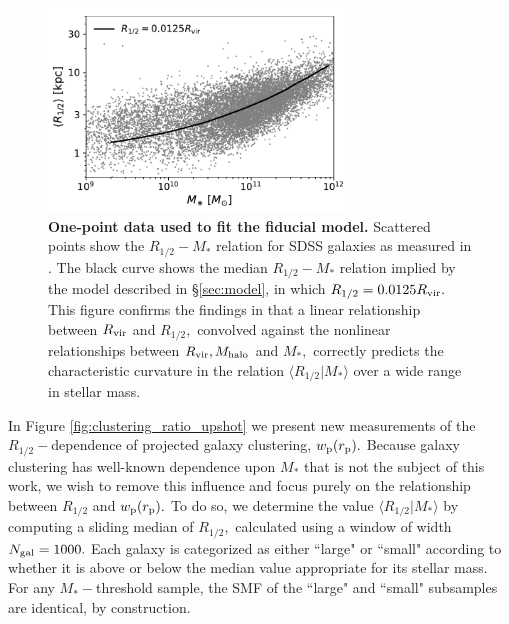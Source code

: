 \documentclass[usenatbib,usegraphicx,letterpaper]{mn2e}
\newcommand{\rhalf}{R_{1/2}}
\newcommand{\mstar}{M_{\ast}}
\newcommand{\mhalo}{M_{\rm halo}}
\newcommand{\rvir}{R_{\rm vir}}
\newcommand{\rproj}{r_{\rm p}}
\newcommand{\wproj}{w_{\rm p}}
\begin{document}
\begin{figure}
\centering
\includegraphics[width=8cm]{FIGS/single_component_model_vs_sdss_one_point.pdf}
\caption{
{\bf One-point data used to fit the fiducial model.}
Scattered points show the $\rhalf-\mstar$ relation for SDSS galaxies as measured in \citet{meert_etal15}. The black curve shows the median $\rhalf-\mstar$ relation implied by the model described in \S\ref{sec:model}, in which $\rhalf=0.0125\rvir.$ This figure confirms the findings in \citet{kravtsov13} that a linear relationship between $\rvir$ and $\rhalf,$ convolved against the nonlinear relationships between $\rvir, \mhalo$ and $\mstar,$ correctly predicts the characteristic curvature in the relation $\langle\rhalf\vert\mstar\rangle$ over a wide range in stellar mass.
}
\label{fig:scatter_plot}
\end{figure}

In Figure \ref{fig:clustering_ratio_upshot} we present new measurements of the $\rhalf-$dependence of projected galaxy clustering, $\wproj(\rproj).$ Because galaxy clustering has well-known dependence upon $\mstar$ that is not the subject of this work, we wish to remove this influence and focus purely on the relationship between $\rhalf$ and $\wproj(\rproj).$ To do so, we determine the value $\langle\rhalf\vert\mstar\rangle$ by computing a sliding median of $\rhalf,$ calculated using a window of width $N_{\rm gal}=1000.$ Each galaxy is categorized as either ``large" or ``small" according to whether it is above or below the median value appropriate for its stellar mass. For any $\mstar-$threshold sample, the SMF of the ``large" and ``small" subsamples are identical, by construction. 
\end{document}
